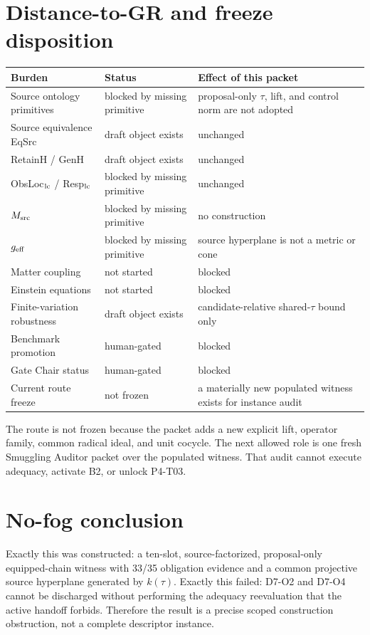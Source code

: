\documentclass[11pt]{article}
\begin{document}
\section{Distance-to-GR and freeze disposition}

\begin{longtable}{>{\raggedright\arraybackslash}p{}>{\raggedright\arraybackslash}p{}>{\raggedright\arraybackslash}p{}}
\toprule
Burden & Status & Effect of this packet\\
\midrule
Source ontology primitives & blocked by missing primitive & proposal-only \(\tau\), lift, and control norm are not adopted\\
Source equivalence EqSrc & draft object exists & unchanged\\
RetainH / GenH & draft object exists & unchanged\\
ObsLoc\(_{\rm lc}\) / Resp\(_{\rm lc}\) & blocked by missing primitive & unchanged\\
\(M_{\rm src}\) & blocked by missing primitive & no construction\\
\(g_{\rm eff}\) & blocked by missing primitive & source hyperplane is not a metric or cone\\
Matter coupling & not started & blocked\\
Einstein equations & not started & blocked\\
Finite-variation robustness & draft object exists & candidate-relative shared-\(\tau\) bound only\\
Benchmark promotion & human-gated & blocked\\
Gate Chair status & human-gated & blocked\\
Current route freeze & not frozen & a materially new populated witness exists for instance audit\\
\bottomrule
\end{longtable}

The route is not frozen because the packet adds a new explicit lift, operator
family, common radical ideal, and unit cocycle. The next allowed role is one
fresh Smuggling Auditor packet over the populated witness. That audit cannot
execute adequacy, activate B2, or unlock P4-T03.

\section{No-fog conclusion}

Exactly this was constructed: a ten-slot, source-factorized, proposal-only
equipped-chain witness with 33/35 obligation evidence and a common projective
source hyperplane generated by \(k(\tau)\). Exactly this failed: D7-O2 and
D7-O4 cannot be discharged without performing the adequacy reevaluation that
the active handoff forbids. Therefore the result is a precise scoped
construction obstruction, not a complete descriptor instance.
\end{document}
